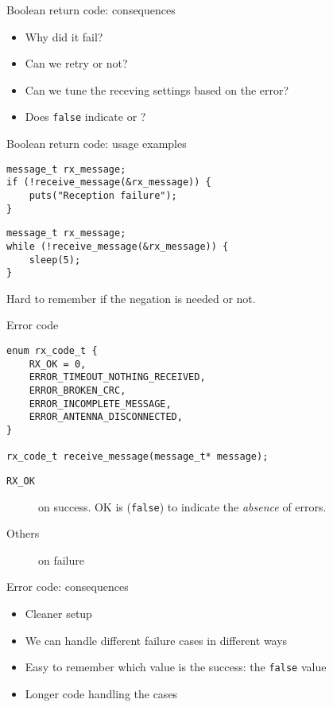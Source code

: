 \documentclass[aspectratio=169,14pt]{beamer}
\begin{document}
\begin{frame}[fragile]{Boolean return code: consequences}
    \begin{itemize}
        \item Why did it fail?
        \item Can we retry or not?
        \item Can we tune the receving settings based on the error?
        \item Does \texttt{false} indicate  or ?
    \end{itemize}
\end{frame}


\begin{frame}[fragile]{Boolean return code: usage examples}
\begin{lstlisting}[style=cstyle]
message_t rx_message;
if (!receive_message(&rx_message)) {
    puts("Reception failure");
}
\end{lstlisting}

\begin{lstlisting}[style=cstyle]
message_t rx_message;
while (!receive_message(&rx_message)) {
    sleep(5);
}
\end{lstlisting}

Hard to remember if the negation is needed or not.
\end{frame}


\begin{frame}[fragile]{Error code}
\begin{lstlisting}[style=cstyle]
enum rx_code_t {
    RX_OK = 0,
    ERROR_TIMEOUT_NOTHING_RECEIVED,
    ERROR_BROKEN_CRC,
    ERROR_INCOMPLETE_MESSAGE,
    ERROR_ANTENNA_DISCONNECTED,
}

rx_code_t receive_message(message_t* message);
\end{lstlisting}

\begin{description}
    \item[\texttt{RX\_OK}] on success. OK is (\texttt{false}) to indicate the \textit{absence} of errors.
    \item[Others] on failure
\end{description}
\end{frame}


\begin{frame}[fragile]{Error code: consequences}
    \begin{itemize}
        \item Cleaner setup
        \item We can handle different failure cases in different ways
        \item Easy to remember which value is the success: the \texttt{false} value
        \item Longer code handling the cases
    \end{itemize}
\end{frame}
\end{document}
